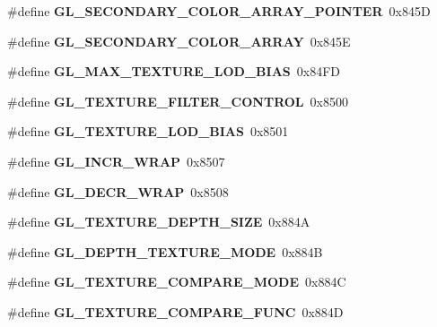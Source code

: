 \begin{DoxyCompactItemize}
\item 
\#define {\bfseries G\+L\+\_\+\+S\+E\+C\+O\+N\+D\+A\+R\+Y\+\_\+\+C\+O\+L\+O\+R\+\_\+\+A\+R\+R\+A\+Y\+\_\+\+P\+O\+I\+N\+T\+E\+R}~0x845\+D\label{_s_d_l__opengl_8h_a91c34b3865bc510b1a61738cb2634aed}

\item 
\#define {\bfseries G\+L\+\_\+\+S\+E\+C\+O\+N\+D\+A\+R\+Y\+\_\+\+C\+O\+L\+O\+R\+\_\+\+A\+R\+R\+A\+Y}~0x845\+E\label{_s_d_l__opengl_8h_a6ac28b896f75279635379ad3df75404c}

\item 
\#define {\bfseries G\+L\+\_\+\+M\+A\+X\+\_\+\+T\+E\+X\+T\+U\+R\+E\+\_\+\+L\+O\+D\+\_\+\+B\+I\+A\+S}~0x84\+F\+D\label{_s_d_l__opengl_8h_af3c04d4a742575ddfbfbea5569f8386d}

\item 
\#define {\bfseries G\+L\+\_\+\+T\+E\+X\+T\+U\+R\+E\+\_\+\+F\+I\+L\+T\+E\+R\+\_\+\+C\+O\+N\+T\+R\+O\+L}~0x8500\label{_s_d_l__opengl_8h_a375902931852ab1b76ef575c01746b09}

\item 
\#define {\bfseries G\+L\+\_\+\+T\+E\+X\+T\+U\+R\+E\+\_\+\+L\+O\+D\+\_\+\+B\+I\+A\+S}~0x8501\label{_s_d_l__opengl_8h_a40c7ab0c2d1b3d6c7d12cdb317bb3e61}

\item 
\#define {\bfseries G\+L\+\_\+\+I\+N\+C\+R\+\_\+\+W\+R\+A\+P}~0x8507\label{_s_d_l__opengl_8h_ae9efa4d7622ad01999c4c29081218943}

\item 
\#define {\bfseries G\+L\+\_\+\+D\+E\+C\+R\+\_\+\+W\+R\+A\+P}~0x8508\label{_s_d_l__opengl_8h_ae394492c09563af8f82764c864d77864}

\item 
\#define {\bfseries G\+L\+\_\+\+T\+E\+X\+T\+U\+R\+E\+\_\+\+D\+E\+P\+T\+H\+\_\+\+S\+I\+Z\+E}~0x884\+A\label{_s_d_l__opengl_8h_a73ddc0f0c3f8f296d0b01da64b710193}

\item 
\#define {\bfseries G\+L\+\_\+\+D\+E\+P\+T\+H\+\_\+\+T\+E\+X\+T\+U\+R\+E\+\_\+\+M\+O\+D\+E}~0x884\+B\label{_s_d_l__opengl_8h_a878be7212e908bb676501a98cfee4a57}

\item 
\#define {\bfseries G\+L\+\_\+\+T\+E\+X\+T\+U\+R\+E\+\_\+\+C\+O\+M\+P\+A\+R\+E\+\_\+\+M\+O\+D\+E}~0x884\+C\label{_s_d_l__opengl_8h_af5a50515d121e0ef24a67977c667add0}

\item 
\#define {\bfseries G\+L\+\_\+\+T\+E\+X\+T\+U\+R\+E\+\_\+\+C\+O\+M\+P\+A\+R\+E\+\_\+\+F\+U\+N\+C}~0x884\+D\label{_s_d_l__opengl_8h_a06b8fecef765b110cff1a8aa1adbd794}


\end{DoxyCompactItemize}
